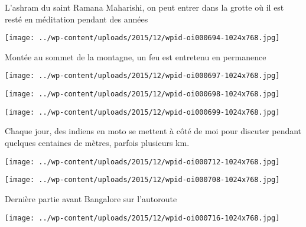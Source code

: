  

 L'ashram du saint Ramana Maharishi, on peut entrer dans la grotte où il est resté en méditation pendant des années 

 

\begin{center} \texttt{[image: ../wp-content/uploads/2015/12/wpid-oi000694-1024x768.jpg]} \end{center}

 

 Montée au sommet de la montagne, un feu est entretenu en permanence 

 

\begin{center} \texttt{[image: ../wp-content/uploads/2015/12/wpid-oi000697-1024x768.jpg]} \end{center}

 

 

\begin{center} \texttt{[image: ../wp-content/uploads/2015/12/wpid-oi000698-1024x768.jpg]} \end{center}

 

 

\begin{center} \texttt{[image: ../wp-content/uploads/2015/12/wpid-oi000699-1024x768.jpg]} \end{center}

 

 Chaque jour, des indiens en moto se mettent à côté de moi pour discuter pendant quelques centaines de mètres, parfois plusieurs km. 

 

\begin{center} \texttt{[image: ../wp-content/uploads/2015/12/wpid-oi000712-1024x768.jpg]} \end{center}

 

 

\begin{center} \texttt{[image: ../wp-content/uploads/2015/12/wpid-oi000708-1024x768.jpg]} \end{center}

 

 Dernière partie avant Bangalore sur l'autoroute 

 

\begin{center} \texttt{[image: ../wp-content/uploads/2015/12/wpid-oi000716-1024x768.jpg]} \end{center}


